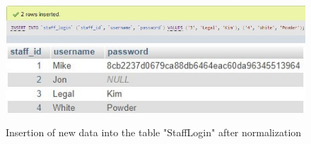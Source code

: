\documentclass{article}
\begin{document}
		\begin{figure}[H]
			\includegraphics[width=\textwidth]{stafflogin1_insert_norm}
			\includegraphics[width=\textwidth]{stafflogin2_insert_norm}
			\caption{Insertion of new data into the table "Staff\textunderscore Login" after normalization}
		\end{figure}
\end{document}

